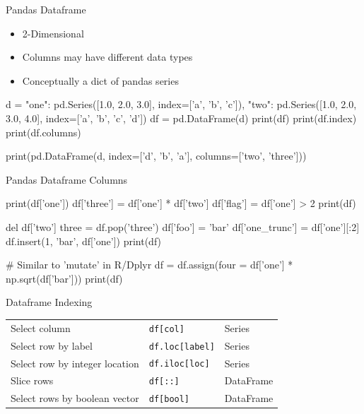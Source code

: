 \documentclass[ignorenonframetext,xcolor=x11names]{beamer}
\begin{document}
\begin{frame}[fragile]{Pandas Dataframe}
\begin{itemize}
   \item 2-Dimensional
   \item Columns may have different data types
   \item Conceptually a dict of pandas series 
\end{itemize}
\footnotesize
\begin{pythoncode}
d = {
    "one": pd.Series([1.0, 2.0, 3.0], 
                index=['a', 'b', 'c']),
    "two": pd.Series([1.0, 2.0, 3.0, 4.0], 
                index=['a', 'b', 'c', 'd'])
}
df = pd.DataFrame(d)
print(df)
print(df.index)
print(df.columns)

print(pd.DataFrame(d, index=['d', 'b', 'a'], 
                      columns=['two', 'three']))
\end{pythoncode}
\end{frame}

\begin{frame}[fragile]{Pandas Dataframe Columns}
\footnotesize
\begin{pythoncode}
print(df['one'])
df['three'] = df['one'] * df['two']
df['flag'] = df['one'] > 2
print(df)

del df['two']
three = df.pop('three')
df['foo'] = 'bar'
df['one_trunc'] = df['one'][:2]
df.insert(1, 'bar', df['one'])
print(df)

# Similar to 'mutate' in R/Dplyr 
df = df.assign(four = df['one'] * np.sqrt(df['bar']))
print(df)
\end{pythoncode}
\end{frame}

\begin{frame}{Dataframe Indexing}
\renewcommand{\arraystretch}{1.5}
\centering
\small

\begin{tabular}{l|l|l} \hline
Select column & \texttt{df[col]} & Series \\
Select row by label & \texttt{df.loc[label]}  & Series \\
Select row by integer location & \texttt{df.iloc[loc]} & Series \\
Slice rows & \texttt{df[::]} & DataFrame \\
Select rows by boolean vector & \texttt{df[bool]} & DataFrame \\ \hline
\end{tabular}
\end{frame}
\end{document}
